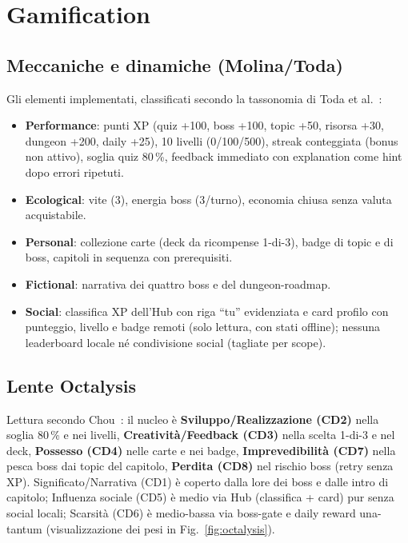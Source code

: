 \chapter{Gamification}
\label{g:gamification}

\section{Meccaniche e dinamiche (Molina/Toda)}
Gli elementi implementati, classificati secondo la tassonomia di Toda et
al.~\cite{toda}:
\begin{itemize}
\item \textbf{Performance}: punti XP (quiz +100, boss +100, topic +50,
risorsa +30, dungeon +200, daily +25), 10 livelli
(0/100/500), streak conteggiata (bonus non attivo), soglia quiz
80\,\%, feedback immediato con explanation come hint dopo
errori ripetuti.
\item \textbf{Ecological}: vite (3), energia boss (3/turno), economia chiusa
senza valuta acquistabile.
\item \textbf{Personal}: collezione carte (deck da ricompense 1-di-3),
badge di topic e di boss, capitoli in sequenza con prerequisiti.
\item \textbf{Fictional}: narrativa dei quattro boss e del dungeon-roadmap.
\item \textbf{Social}: classifica XP dell'Hub con riga ``tu'' evidenziata
e card profilo con punteggio, livello e badge remoti (solo lettura,
con stati offline); nessuna leaderboard locale n\'e condivisione
social (tagliate per scope).
\end{itemize}

\section{Lente Octalysis}
Lettura secondo Chou~\cite{chou}: il nucleo \`e
\textbf{Sviluppo/Realizzazione (CD2)} nella soglia 80\,\% e nei livelli,
\textbf{Creativit\`a/Feedback (CD3)} nella scelta 1-di-3 e nel deck,
\textbf{Possesso (CD4)} nelle carte e nei badge,
\textbf{Imprevedibilit\`a (CD7)} nella pesca boss dai topic del capitolo,
\textbf{Perdita (CD8)} nel rischio boss (retry senza XP).
Significato/Narrativa (CD1) \`e coperto dalla lore dei boss e dalle intro
di capitolo; Influenza sociale (CD5) \`e medio via Hub (classifica +
card) pur senza social locali; Scarsit\`a (CD6) \`e medio-bassa via
boss-gate e daily reward una-tantum (visualizzazione dei pesi in
Fig.~\ref{fig:octalysis}).

